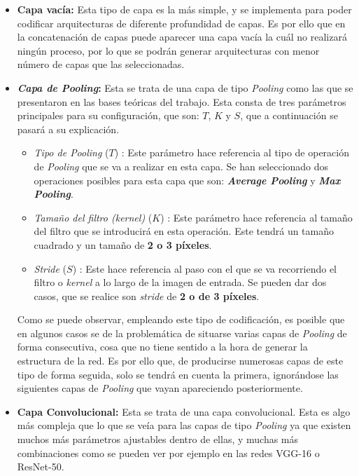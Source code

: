 \begin{itemize}
    \item \textbf{Capa vacía:} Esta tipo de capa es la más simple, y se implementa para poder codificar arquitecturas de diferente profundidad de capas. Es por ello que en la concatenación de capas puede aparecer una capa vacía la cuál no realizará ningún proceso, por lo que se podrán generar arquitecturas con menor número de capas que las seleccionadas.
    
    \item \textbf{\textit{Capa de Pooling}:} Esta se trata de una capa de tipo \textit{Pooling} como las que se presentaron en las bases teóricas del trabajo. Esta consta de tres parámetros principales para su configuración, que son: $T$, $K$ y $S$, que a continuación se pasará a su explicación.
    
    \begin{itemize}
        \item \textit{Tipo de Pooling} ($T$) :  Este parámetro hace referencia al tipo de operación de \textit{Pooling} que se va a realizar en esta capa. Se han seleccionado dos operaciones posibles para esta capa que son: \textbf{\textit{Average Pooling}} y \textbf{\textit{Max Pooling}}.
        
        \item \textit{Tamaño del filtro (kernel)} ($K$) : Este parámetro hace referencia al tamaño del filtro que se introducirá en esta operación. Este tendrá un tamaño cuadrado y un tamaño de \textbf{2 o 3 píxeles}.
        
        \item \textit{Stride} ($S$) : Este hace referencia al paso con el que se va recorriendo el filtro o \textit{kernel} a lo largo de la imagen de entrada. Se pueden dar dos casos, que se realice son \textit{stride} de \textbf{2 o de 3 píxeles}.
        
    \end{itemize}
    
    Como se puede observar, empleando este tipo de codificación, es posible que en algunos casos se de la problemática de situarse varias capas de \textit{Pooling} de forma consecutiva, cosa que no tiene sentido a la hora de generar la estructura de la red. Es por ello que, de producirse numerosas capas de este tipo de forma seguida, solo se tendrá en cuenta la primera, ignorándose las siguientes capas de \textit{Pooling} que vayan apareciendo posteriormente.
    
    \item \textbf{Capa Convolucional:} Esta se trata de una capa convolucional. Esta es algo más compleja que lo que se veía para las capas de tipo \textit{Pooling} ya que existen muchos más parámetros ajustables dentro de ellas, y muchas más combinaciones como se pueden ver por ejemplo en las redes VGG-16 o ResNet-50. 
    

\end{itemize}
